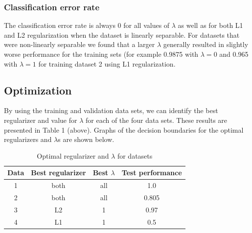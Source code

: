 \documentclass{article}
\begin{document}
\subsubsection{Classification error rate}
The classification error rate is always $0$ for all values of $\lambda$ as well as for both L1 and L2 regularization when the dataset is linearly separable. For datasets that were non-linearly separable we found that a larger $\lambda$ generally resulted in slightly worse performance for the training sets (for example 0.9875 with $\lambda = 0$ and 0.965 with $\lambda = 1$ for training dataset 2 using L1 regularization.

\subsection{Optimization}
By using the training and validation data sets, we can identify the best regularizer and value for $\lambda$ for each of the four data sets. These results are presented in Table 1 (above). Graphs of the decision boundaries for the optimal regularizers and $\lambda$s are shown below.

\begin{table}
  \begin{center}
    \begin{tabular}{ | c | c | c | c | }
      \hline
      Data & Best regularizer & Best $\lambda$ & Test performance \\ \hline
      1       & both           & all            & 1.0 \\ \hline
      2       & both           & all            & 0.805 \\ \hline
      3       & L2               & 1             & 0.97 \\ \hline
      4       & L1               & 1             & 0.5 \\ \hline
    \end{tabular}
  \end{center}
  \caption{Optimal regularizer and $\lambda$ for datasets}
\end{table}
\end{document}
